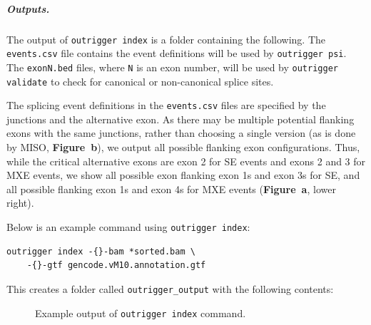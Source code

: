 \subparagraph{Outputs.} The output of \texttt{outrigger index} is a folder containing the following. The \texttt{events.csv} file contains the event definitions will be used by \texttt{outrigger psi}. The \texttt{exonN.bed} files, where \texttt{N} is an exon number, will be used by \texttt{outrigger validate} to check for canonical or non-canonical splice sites.

The splicing event definitions in the \texttt{events.csv} files are specified by the junctions and the alternative exon. As there may be multiple potential flanking exons with the same junctions, rather than choosing a single version (as is done by MISO, \textbf{Figure~b}), we output all possible flanking exon configurations. Thus, while the critical alternative exons are exon 2 for SE events and exons 2 and 3 for MXE events, we show all possible exon flanking exon 1s and exon 3s for SE, and all possible flanking exon 1s and exon 4s for MXE events (\textbf{Figure~a}, lower right).

Below is an example command using \texttt{outrigger index}:

\begin{verbatim}
outrigger index -{}-bam *sorted.bam \
    -{}-gtf gencode.vM10.annotation.gtf
\end{verbatim}

This creates a folder called \texttt{outrigger\_output} with the following contents:


\begin{figure}
\footnotesize
{}
\caption{Example output of \texttt{outrigger index} command.}
\end{figure}

